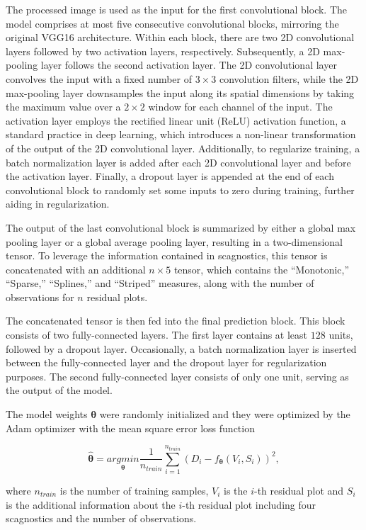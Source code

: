 \documentclass[]{interact}
\theoremstyle{plain}%
\theoremstyle{definition}
\theoremstyle{remark}
\begin{document}
The processed image is used as the input for the first convolutional
block. The model comprises at most five consecutive convolutional
blocks, mirroring the original VGG16 architecture. Within each block,
there are two 2D convolutional layers followed by two activation layers,
respectively. Subsequently, a 2D max-pooling layer follows the second
activation layer. The 2D convolutional layer convolves the input with a
fixed number of \(3 \times 3\) convolution filters, while the 2D
max-pooling layer downsamples the input along its spatial dimensions by
taking the maximum value over a \(2 \times 2\) window for each channel
of the input. The activation layer employs the rectified linear unit
(ReLU) activation function, a standard practice in deep learning, which
introduces a non-linear transformation of the output of the 2D
convolutional layer. Additionally, to regularize training, a batch
normalization layer is added after each 2D convolutional layer and
before the activation layer. Finally, a dropout layer is appended at the
end of each convolutional block to randomly set some inputs to zero
during training, further aiding in regularization.

The output of the last convolutional block is summarized by either a
global max pooling layer or a global average pooling layer, resulting in
a two-dimensional tensor. To leverage the information contained in
scagnostics, this tensor is concatenated with an additional
\(n \times 5\) tensor, which contains the ``Monotonic,'' ``Sparse,''
``Splines,'' and ``Striped'' measures, along with the number of
observations for \(n\) residual plots.

The concatenated tensor is then fed into the final prediction block.
This block consists of two fully-connected layers. The first layer
contains at least \(128\) units, followed by a dropout layer.
Occasionally, a batch normalization layer is inserted between the
fully-connected layer and the dropout layer for regularization purposes.
The second fully-connected layer consists of only one unit, serving as
the output of the model.

The model weights \(\boldsymbol{\theta}\) were randomly initialized and
they were optimized by the Adam optimizer with the mean square error
loss function

\[\hat{\boldsymbol{\theta}} = \underset{\boldsymbol{\theta}}{argmin}\frac{1}{n_{train}}\sum_{i=1}^{n_{train}}(D_i - f_{\boldsymbol{\theta}}(V_i, S_i))^2,\]

\noindent where \(n_{train}\) is the number of training samples, \(V_i\)
is the \(i\)-th residual plot and \(S_i\) is the additional information
about the \(i\)-th residual plot including four scagnostics and the
number of observations.
\end{document}
